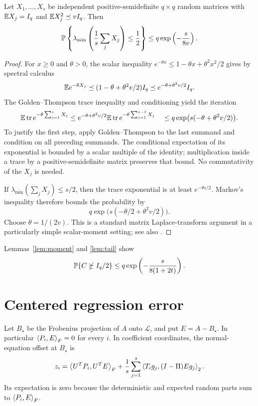 \documentclass[11pt]{article}
\begin{document}
\begin{lemma}\label{lem:tail}
Let $X_1,\ldots,X_s$ be independent positive-semidefinite $q\times q$ random matrices with $\mathbb E X_j=I_q$ and $\mathbb E X_j^2\preceq vI_q$. Then
\[
 \mathbb P\left\{\lambda_{\min}\left(\frac1s\sum_jX_j\right)\le\frac12\right\}
 \le q\exp\left(-\frac{s}{8v}\right).
\]
\end{lemma}
\begin{proof}
For $x\ge0$ and $\theta>0$, the scalar inequality
$e^{-\theta x}\le1-\theta x+\theta^2x^2/2$ gives by spectral calculus
\[
 \mathbb E e^{-\theta X_j}
 \preceq(1-\theta+\theta^2v/2)I_q
 \preceq e^{-\theta+\theta^2v/2}I_q.
\]
The Golden--Thompson trace inequality \cite{Golden1965} and conditioning yield the iteration
\begin{align*}
 \mathbb E\operatorname{tr} e^{-\theta\sum_{j=1}^sX_j}
 &\le e^{-\theta+\theta^2v/2}
       \mathbb E\operatorname{tr} e^{-\theta\sum_{j=1}^{s-1}X_j}\
 &\le q\exp\bigl(s(-\theta+\theta^2v/2)\bigr).
\end{align*}
To justify the first step, apply Golden--Thompson to the last summand and condition on all preceding summands. The conditional expectation of its exponential is bounded by a scalar multiple of the identity; multiplication inside a trace by a positive-semidefinite matrix preserves that bound. No commutativity of the $X_j$ is needed.

If $\lambda_{\min}(\sum_jX_j)\le s/2$, then the trace exponential is at least $e^{-\theta s/2}$. Markov's inequality therefore bounds the probability by
\[
 q\exp\bigl(s(-\theta/2+\theta^2v/2)\bigr).
\]
Choose $\theta=1/(2v)$. This is a standard matrix Laplace-transform argument in a particularly simple scalar-moment setting; see also \cite{Tropp2012}.
\end{proof}

Lemmas~\ref{lem:moment} and \ref{lem:tail} show
\begin{equation}\label{eq:gramgood}
 \mathbb P\{C\nsucceq I_q/2\}
 \le q\exp\left(-\frac{s}{8(1+2t)}\right).
\end{equation}

\section{Centered regression error}
Let $B_\star$ be the Frobenius projection of $A$ onto $\mathcal L$, and put $E=A-B_\star$. In particular $\left\langle P_i,E\right\rangle_F=0$ for every $i$. In coefficient coordinates, the normal-equation offset at $B_\star$ is
\[
 z_i=\left\langle U^TP_i,U^TE\right\rangle_F
       +\frac1s\sum_{j=1}^s\left\langle T_i g_j,(I-\Pi)E g_j\right\rangle_2.
\]
Its expectation is zero because the deterministic and expected random parts sum to $\left\langle P_i,E\right\rangle_F$.
\end{document}
